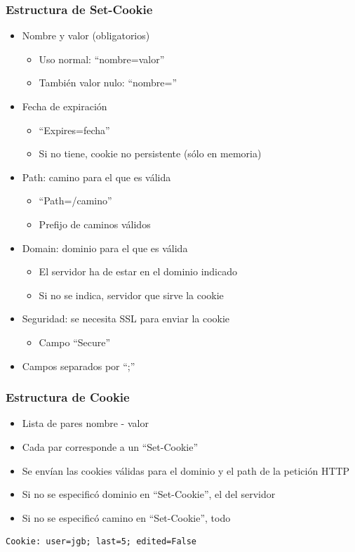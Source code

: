 \begin{frame}
\frametitle{Estructura de Set-Cookie}

\begin{itemize}
\item Nombre y valor (obligatorios)
  \begin{itemize}
  \item Uso normal: ``nombre=valor''
  \item También valor nulo: ``nombre=''
\end{itemize}
\item Fecha de expiración
  \begin{itemize}
  \item ``Expires=fecha''
  \item Si no tiene, cookie no persistente (sólo en memoria)
  \end{itemize}
\item Path: camino para el que es válida
  \begin{itemize}
  \item ``Path=/camino''
  \item Prefijo de caminos válidos
  \end{itemize}
\item Domain: dominio para el que es válida
  \begin{itemize}
  \item El servidor ha de estar en el dominio indicado
  \item Si no se indica, servidor que sirve la cookie
  \end{itemize}
\item Seguridad: se necesita SSL para enviar la cookie
  \begin{itemize}
  \item Campo ``Secure'' 
  \end{itemize}
\item Campos separados por ``;''
\end{itemize}
\end{frame}

\begin{frame}[fragile]
\frametitle{Estructura de Cookie}

\begin{itemize}
\item Lista de pares nombre - valor
\item Cada par corresponde a un ``Set-Cookie''
\item Se envían las cookies válidas para el dominio y el path de la petición HTTP
\item Si no se especificó dominio en ``Set-Cookie'', el del servidor
\item Si no se especificó camino en ``Set-Cookie'', todo
\end{itemize}

\begin{verbatim}
Cookie: user=jgb; last=5; edited=False
\end{verbatim}

\end{frame}

